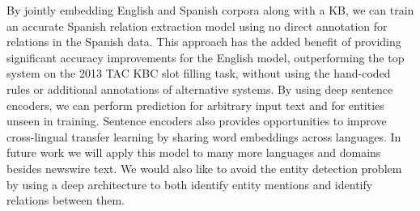 \documentclass{article} %
\begin{document}
By jointly embedding English and Spanish corpora along with a KB, we can train an accurate Spanish relation extraction model using no direct annotation for relations in the Spanish data. This approach has the added benefit of providing significant accuracy improvements for the English model, outperforming the top system on the 2013 TAC KBC slot filling task, without using the hand-coded rules or additional annotations of alternative systems. By using deep sentence encoders, we can perform prediction for arbitrary input text and for entities unseen in training. Sentence encoders also provides opportunities to improve cross-lingual transfer learning by sharing word embeddings across languages. In future work we will apply this model to many more languages and domains besides newswire text. We would also like to avoid the entity detection problem by using a deep architecture to both identify entity mentions and identify relations between them.





\newpage
%
\end{document}
